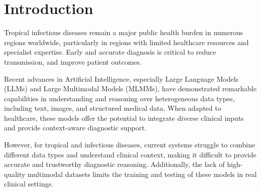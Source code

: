\section{Introduction}
\label{sec:introduction}


Tropical infectious diseases remain a major public health burden in numerous regions worldwide, particularly in regions with limited healthcare resources and specialist expertise. 
Early and accurate diagnosis is critical to reduce transmission, and improve patient outcomes.



Recent advances in Artificial Intelligence, especially Large Language Models (LLMs) and Large Multimodal Models (MLMMs), have demonstrated remarkable capabilities in understanding and reasoning over heterogeneous data types, including text, images, and structured medical data. When adapted to healthcare, these models offer the potential to integrate diverse clinical inputs and provide context-aware diagnostic support.

However, for tropical and infectious diseases, current systems struggle to combine different data types and understand clinical context, making it difficult to provide accurate and trustworthy diagnostic reasoning. Additionally, the lack of high-quality multimodal datasets limits the training and testing of these models in real clinical settings.

